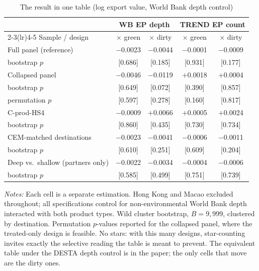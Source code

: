 \begin{table}[H]
\centering
\footnotesize
\caption{The result in one table (log export value, World Bank depth control)}
\label{tab:summary}
\begin{threeparttable}
\begin{tabular}{lcccc}
\toprule
 & \multicolumn{2}{c}{WB EP depth} & \multicolumn{2}{c}{TREND EP count} \\
\cmidrule(lr){2-3}\cmidrule(lr){4-5}
Sample / design & $\times$ green & $\times$ dirty & $\times$ green & $\times$ dirty \\
\midrule
Full panel (reference)      & $-$0.0023 & $-$0.0044 & $-$0.0001 & $-$0.0009 \\
\quad bootstrap $p$         & [0.686] & [0.185] & [0.931] & [0.177] \\
\addlinespace[3pt]
Collapsed panel             & $-$0.0046 & $-$0.0119 & $+$0.0018 & $+$0.0004 \\
\quad bootstrap $p$         & [0.649] & [0.072] & [0.390] & [0.857] \\
\quad permutation $p$       & [0.597] & [0.278] & [0.160] & [0.817] \\
\addlinespace[3pt]
C-prod-HS4                  & $-$0.0009 & $+$0.0066 & $+$0.0005 & $+$0.0024 \\
\quad bootstrap $p$         & [0.860] & [0.435] & [0.730] & [0.734] \\
\addlinespace[3pt]
CEM-matched destinations    & $-$0.0023 & $-$0.0041 & $-$0.0006 & $-$0.0011 \\
\quad bootstrap $p$         & [0.610] & [0.251] & [0.609] & [0.204] \\
\addlinespace[3pt]
Deep vs.\ shallow (partners only) & $-$0.0022 & $-$0.0034 & $-$0.0004 & $-$0.0006 \\
\quad bootstrap $p$         & [0.585] & [0.499] & [0.751] & [0.739] \\
\bottomrule
\end{tabular}
\begin{tablenotes}[flushleft]\footnotesize
\item \emph{Notes:} Each cell is a separate estimation. Hong Kong and Macao excluded throughout; all
specifications control for non-environmental World Bank depth interacted with both product types.
Wild cluster bootstrap, $B = 9{,}999$, clustered by destination. Permutation $p$-values reported for
the collapsed panel, where the treated-only design is feasible. No stars: with this many designs,
star-counting invites exactly the selective reading the table is meant to prevent. The equivalent
table under the DESTA depth control is in the paper; the only cells that move are the dirty ones.
\end{tablenotes}
\end{threeparttable}
\end{table}

